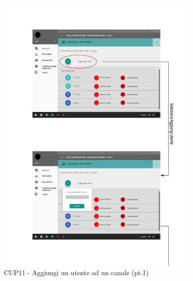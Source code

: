 \begin{figure}
	\centering
	\includegraphics[width=0.9\textwidth]{imgs/gruppo6/activities/act_cup11_aggiungi_utente_canale1.pdf}
	\caption{CUP11 - Aggiungi un utente ad un canale (pt.1)}
	\label{fig:act-cup11}
\end{figure}


